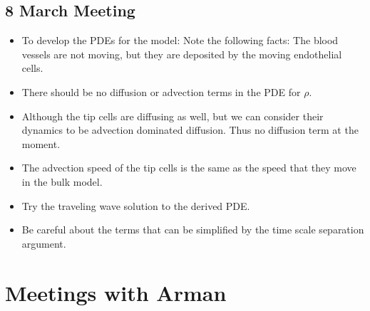 \subsection{8 March Meeting}
\begin{itemize}
	\item To develop the PDEs for the model: Note the following facts: The blood vessels are not moving, but they are deposited by the moving endothelial cells.
	\item There should be no diffusion or advection terms in the PDE for $ \rho $.
	\item Although the tip cells are diffusing as well, but we can consider their dynamics to be advection dominated diffusion. Thus no diffusion term at the moment.
	\item The advection speed of the tip cells is the same as the speed that they move in the bulk model.
	\item Try the traveling wave solution to the derived PDE.
	\item Be careful about the terms that can be simplified by the time scale separation argument. 
\end{itemize}

\section{Meetings with Arman}
